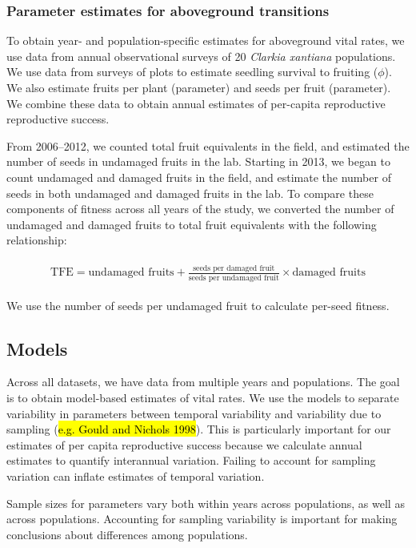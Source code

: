 \documentclass[12pt, oneside, titlepage]{article}   	%
\begin{document}
\subsubsection*{Parameter estimates for aboveground transitions}

To obtain year- and population-specific estimates for aboveground vital rates, we use data from annual observational surveys of 20 \textit{Clarkia xantiana} populations. We use data from surveys of plots to estimate seedling survival to fruiting ($\phi$). We also estimate fruits per plant (parameter) and seeds per fruit (parameter). We combine these data to obtain annual estimates of per-capita reproductive reproductive success.

From 2006--2012, we counted total fruit equivalents in the field, and estimated the number of seeds in undamaged fruits in the lab. Starting in 2013, we began to count undamaged and damaged fruits in the field, and estimate the number of seeds in both undamaged and damaged fruits in the lab. To compare these components of fitness across all years of the study, we converted the number of undamaged and damaged fruits to total fruit equivalents with the following relationship:

%
    \begin{align}
\begin{split}
\textrm{TFE} = \textrm{undamaged fruits} + \frac{\textrm{seeds per damaged fruit}}{\textrm{seeds per undamaged fruit}}\times  \textrm{damaged fruits} 
  \end{split}
\end{align}
%

We use the number of seeds per undamaged fruit to calculate per-seed fitness. 

\subsection*{Models}

Across all datasets, we have data from multiple years and populations. The goal is to obtain model-based estimates of vital rates. We use the models to separate variability in parameters between temporal variability and variability due to sampling (\hl{e.g. Gould and Nichols 1998}). This is particularly important for our estimates of per capita reproductive success because we calculate annual estimates to quantify interannual variation. Failing to account for sampling variation can inflate estimates of temporal variation. 

Sample sizes for parameters vary both within years across populations, as well as across populations. Accounting for sampling variability is important for making conclusions about differences among populations. 
 
\end{document}
